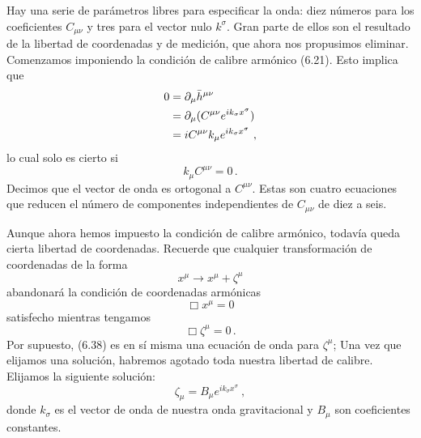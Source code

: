 \documentclass[11pt,b5paper,openany,twoside]{book}
\newcommand{\mn}{{\mu\nu}}
\newcommand{\p}[1]{{\partial_{#1}}}
\def\bh{{\bar h}}
\begin{document}
Hay una serie de parámetros libres para especificar la onda: diez números para los coeficientes $C_\mn$ y tres para el vector nulo $k^\sigma$.
Gran parte de ellos son el resultado de la libertad de coordenadas y de medición, que ahora nos propusimos eliminar.
Comenzamos imponiendo la condición de calibre armónico (6.21).
Esto implica que
\begin{align}
0  &=  \p\mu\bh^\mn  \notag \\   &=  \p\mu(C^\mn e^{ik_\sigma x^\sigma}) \notag \\
&=  iC^\mn k_\mu e^{ik_\sigma x^\sigma}\ , \label{6.34}
\end{align}
lo cual solo es cierto si
\begin{equation}
k_\mu C^\mn=0\,.\label{6.35}
\end{equation}
Decimos que el vector de onda es ortogonal a $C^\mn$.
Estas son cuatro ecuaciones que reducen el número de componentes independientes de $C_\mn$ de diez a seis.

Aunque ahora hemos impuesto la condición de calibre armónico, todavía queda cierta libertad de coordenadas.
Recuerde que cualquier transformación de coordenadas de la forma
\begin{equation}
x^\mu \rightarrow x^\mu + \zeta^\mu\label{6.36}
\end{equation}
abandonará la condición de coordenadas armónicas
\begin{equation}
\Box x^\mu=0 \label{6.37}
\end{equation}
satisfecho mientras tengamos
\begin{equation}
\Box \zeta^\mu=0\,.\label{6.38}
\end{equation}
Por supuesto, (6.38) es en sí misma una ecuación de onda para $\zeta^\mu$; Una vez que elijamos una solución, habremos agotado toda nuestra libertad de calibre.
Elijamos la siguiente solución:
\begin{equation}
\zeta_\mu = B_\mu e^{ik_\sigma x^\sigma}\ ,\label{6.39}
\end{equation}
donde $k_\sigma$ es el vector de onda de nuestra onda gravitacional y $B_\mu$ son coeficientes constantes.
\end{document}
